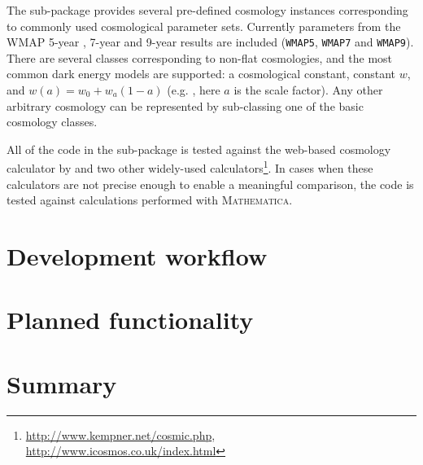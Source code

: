\documentclass[traditabstract]{aa}
\begin{document}
The sub-package provides several pre-defined cosmology instances
corresponding to commonly used cosmological parameter sets. Currently
parameters from the WMAP 5-year \citep{Komatsu09}, 7-year
\citep{Komatsu11} and 9-year results \citep{Hinshaw13} are included
(\texttt{WMAP5}, \texttt{WMAP7} and \texttt{WMAP9}). There are several
classes corresponding to non-flat cosmologies, and the most common
dark energy models are supported: a cosmological constant, constant
$w$, and $w(a) = w_0 + w_a (1-a)$ (e.g. \citealt{Linder03}, here $a$
is the scale factor). Any other arbitrary cosmology can be represented
by sub-classing one of the basic cosmology classes.

All of the code in the sub-package is tested against the web-based
cosmology calculator by \citet{Wright06} and two other widely-used
calculators\footnote{\url{http://www.kempner.net/cosmic.php},\\ \url{http://www.icosmos.co.uk/index.html}}.
In cases when these calculators are not precise enough to enable a
meaningful comparison, the code is tested against calculations
performed with \textsc{Mathematica}.

\section{Development workflow}

\label{sec:workflow}




\section{Planned functionality}

\label{sec:future}



\section{Summary}

\label{sec:summary}




\end{document}
